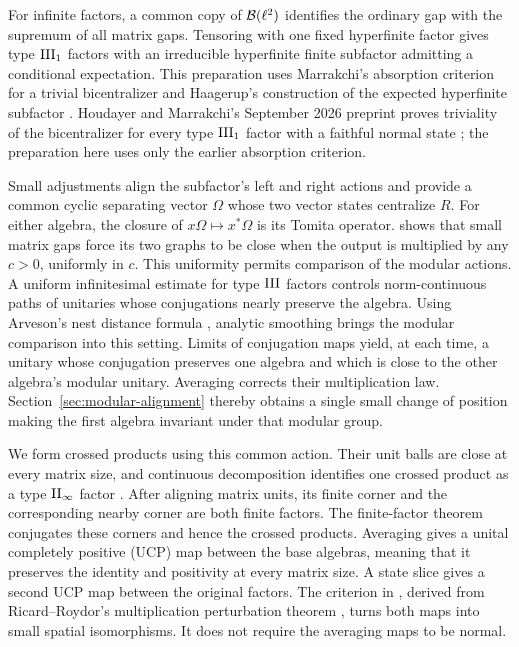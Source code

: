 For infinite factors, a common copy of $\mathcal B(\ell^2)$ identifies the
ordinary gap with the supremum of all matrix gaps. Tensoring with one
fixed hyperfinite factor gives type $\mathrm{III}_1$ factors with an
irreducible hyperfinite finite subfactor admitting a conditional
expectation. This preparation uses Marrakchi's absorption criterion
for a trivial bicentralizer and Haagerup's construction of the expected
hyperfinite subfactor \cite{Marrakchi2020,Haagerup1987}.
Houdayer and Marrakchi's September 2026 preprint proves triviality of
the bicentralizer for every type $\mathrm{III}_1$ factor with a faithful normal
state \cite[Theorem~G]{HoudayerMarrakchi2026}; the preparation here uses
only the earlier absorption criterion.

Small adjustments align the subfactor's left and right actions and
provide a common cyclic separating vector $\Omega$ whose two vector
states centralize $R$. For either algebra, the closure of
$x\Omega\mapsto x^*\Omega$ is its Tomita operator.
 shows that small matrix gaps force its two
graphs to be close when the output is multiplied by any $c>0$,
uniformly in $c$. This uniformity permits comparison of the modular
actions. A uniform infinitesimal estimate for type $\mathrm{III}$ factors
controls norm-continuous paths of unitaries whose conjugations nearly
preserve the algebra. Using Arveson's nest distance formula
\cite{Arveson1975}, analytic smoothing brings the modular comparison
into this setting. Limits of conjugation maps yield, at each time, a
unitary whose conjugation preserves one algebra and which is close to
the other algebra's modular unitary. Averaging corrects their
multiplication law. Section~\ref{sec:modular-alignment} thereby obtains
a single small change of position making the first algebra invariant
under that modular group.

We form crossed products using this common action. Their unit balls
are close at every matrix size, and continuous decomposition identifies
one crossed product as a type $\mathrm{II}_\infty$ factor
\cite{Takesaki1973,Takesaki2003II}. After aligning matrix units, its finite corner
and the corresponding nearby corner are both finite factors. The
finite-factor theorem conjugates these corners and hence the crossed
products. Averaging gives a unital completely positive (UCP) map between
the base algebras, meaning that it preserves the identity and positivity
at every matrix size. A state slice gives a second UCP map between the
original factors. The criterion in , derived from
Ricard--Roydor's multiplication perturbation theorem
\cite[Proposition~3.2]{RicardRoydor2014}, turns both maps into small
spatial isomorphisms. It does not require the averaging maps to be normal.

